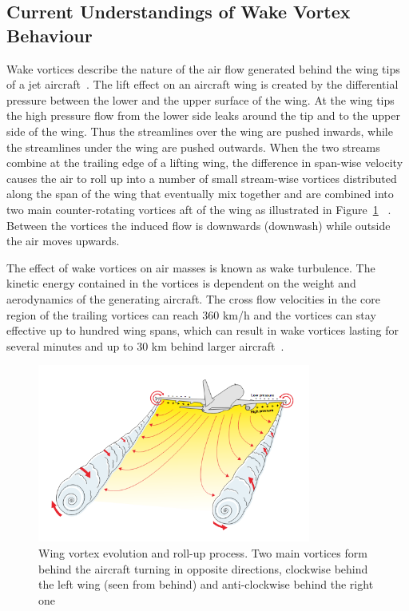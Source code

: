 \subsection{Current Understandings of Wake Vortex Behaviour}
Wake vortices describe the nature of the air flow generated behind the wing tips of a jet aircraft~\cite{doc4444full}.
The lift effect on an aircraft wing is created by the differential pressure between the lower and the upper surface of the wing. 
At the wing tips the high pressure flow from the lower side leaks around the tip and to the upper side of the wing. Thus the streamlines over the wing are pushed inwards, while the streamlines under the wing are pushed outwards. When the two streams combine at the trailing edge of a lifting wing, the difference in span-wise velocity causes the air to roll up into a number of small stream-wise vortices distributed along the span of the wing that eventually mix together and are combined into two main counter-rotating vortices aft of the wing as illustrated in Figure~\ref{fig:vortex_develop} ~\cite{houghton2012aerodynamics,magazine_airbus_safety, Breitsamter2011Feb, gerz_commercial_2002}. Between the vortices the induced flow is downwards (downwash) while outside the air moves upwards.

The effect of wake vortices on air masses is known as wake turbulence. 
The kinetic energy contained in the vortices is dependent on the weight and aerodynamics of the generating aircraft. The cross flow velocities in the core region of the trailing vortices can reach $360$ km/h and the vortices can stay effective up to hundred wing spans, which can result in wake vortices lasting for several minutes and up to $30$ km behind larger aircraft~\cite{Breitsamter2011Feb, gerz_commercial_2002}. 
\begin{figure}[h]
    \centering
    \includegraphics[width=0.8\textwidth]{graphics/WakeVortexPlane.png}
    \caption[Wake vortex roll-up process]{Wing vortex evolution and roll-up process. Two main vortices form behind the aircraft turning in opposite directions, clockwise behind the left wing (seen from behind) and anti-clockwise behind the right one~\cite[p.~043]{magazine_airbus_safety}} \label{fig:vortex_develop}
\end{figure}

